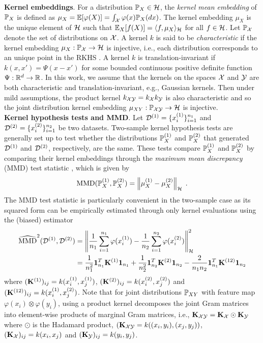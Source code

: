 \textbf{Kernel embeddings}. For a distribution $\P_X\in\calH$, the \textit{kernel mean embedding} of $\P_X$ is defined as $\mu_X=\E[\varphi(X)]=\int_\calX\varphi(x)\P_X(dx)$. The kernel embedding $\mu_X$ is the unique element of $\calH$ such that $\E_X[f(X)]=\langle f,\mu_X\rangle_\calH$ for all $f\in\calH$. Let $\P_\calX$ denote the set of distributions on $\calX$. A kernel $k$ is said to be \textit{characteristic} if the kernel embedding $\mu_X:\P_\calX\rightarrow\calH$ is injective, i.e., each distribution corresponds to an unique point in the RKHS \parencite{Fukumizu:2007}. A kernel $k$ is translation-invariant if $k(x,x') = \Psi(x-x')$ for some bounded continuous positive definite function $\Psi:\bbR^d\rightarrow\bbR$. In this work, we assume that the kernels on the spaces $\calX$ and $\calY$ are both characteristic and translation-invariant, e.g., Gaussian kernels. Then under mild assumptions, the product kernel $k_{\calX\calY}=k_\calX k_\calY$ is also characteristic \parencite[Corollary 11]{Sriperumbudur:2010} and so the joint distribution kernel embedding $\mu_{XY}:\P_{\calX\calY}\rightarrow\calH$ is injective.
\\

\textbf{Kernel hypothesis tests and MMD}. Let $\calD^{(1)}=\{\xo_i\}_{i=1}^{n_1}$ and $\calD^{(2)}=\{\xt_i\}_{i=1}^{n_2}$ be two datasets. Two-sample kernel hypothesis tests are generally set up to test whether the distributions $\P_X^{(1)}$ and $\P_X^{(2)}$ that generated $\calD^{(1)}$ and $\calD^{(2)}$, respectively, are the same. These tests compare $\P_X^{(1)}$ and $\P_X^{(2)}$ by comparing their kernel embeddings through the \textit{maximum mean discrepancy} (MMD) test statistic \parencite{Gretton:2012}, which is given by
\[
\MMD(\P_X^{(1)},\P_X^{(2)}) = \left\|\mu_X^{(1)}-\mu_X^{(2)}\right\|_\calH \;.
\]
The MMD test statistic is particularly convenient in the two-sample case as its squared form can be empirically estimated through only kernel evaluations using the (biased) estimator
\begin{align*}
\hatMMD^2(\calD^{(1)},\calD^{(2)}) &= \left\|\frac{1}{n_1}\sum_{i=1}^{n_1}\varphi(\xo_i)-\frac{1}{n_2}\sum_{i=1}^{n_2}\varphi(\xt_i)\right\|_\calH^2 \\
&= \frac{1}{n_1^2}\onevec_{n_1}^T\bfK^{(1)}\onevec_{n_1} + \frac{1}{n_2^2}\onevec_{n_2}^T\bfK^{(2)}\onevec_{n_2} - \frac{2}{n_1n_2}\onevec_{n_1}^T\bfK^{(12)}\onevec_{n_2}
\end{align*}
where $(\bfK^{(1)})_{ij}=k(\xo_i,\xo_j)$, $(\bfK^{(2)})_{ij}=k(\xt_i,\xt_j)$ and $(\bfK^{(12)})_{ij}=k(\xo_i,\xt_j)$. Note that for joint distributions $\P_{XY}$ with feature map $\varphi(x_i)\otimes\varphi(y_i)$, using a product kernel decomposes the joint Gram matrices into element-wise products of marginal Gram matrices, i.e., $\bfK_{\calX\calY} = \bfK_\calX\odot\bfK_\calY$ where $\odot$ is the Hadamard product, $(\bfK_{\calX\calY}=k((x_i,y_i),(x_j,y_j))$, $(\bfK_\calX)_{ij}=k(x_i,x_j)$ and $(\bfK_\calY)_{ij}=k(y_i,y_j)$.
\\

